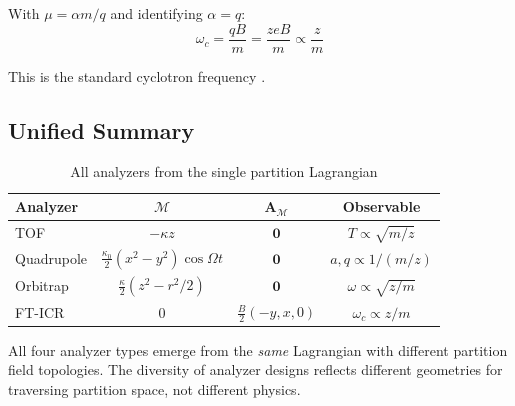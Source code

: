 \documentclass[twocolumn,10pt,a4paper]{article}
\theoremstyle{definition}
\theoremstyle{remark}
\newcommand{\Depth}{\mathcal{M}}
\newcommand{\Apartition}{\mathbf{A}_{\mathcal{M}}}
\newcommand{\partinert}{\mu}
\begin{document}
With $\partinert = \alpha m/q$ and identifying $\alpha = q$:
\begin{equation}
    \boxed{\omega_c = \frac{qB}{m} = \frac{zeB}{m} \propto \frac{z}{m}}
\end{equation}

This is the standard cyclotron frequency \citep{marshall1998}.

\subsection{Unified Summary}

\begin{table}[H]
\centering
\caption{All analyzers from the single partition Lagrangian}
\label{tab:analyzers}
\small
\begin{tabular}{lccc}
\toprule
\textbf{Analyzer} & \textbf{$\Depth$} & \textbf{$\Apartition$} & \textbf{Observable} \\
\midrule
TOF & $-\kappa z$ & $\mathbf{0}$ & $T \propto \sqrt{m/z}$ \\
Quadrupole & $\frac{\kappa_0}{2}(x^2\!-\!y^2)\cos\Omega t$ & $\mathbf{0}$ & $a,q \propto 1/(m/z)$ \\
Orbitrap & $\frac{\kappa}{2}(z^2\!-\!r^2/2)$ & $\mathbf{0}$ & $\omega \propto \sqrt{z/m}$ \\
FT-ICR & $0$ & $\frac{B}{2}(-y,x,0)$ & $\omega_c \propto z/m$ \\
\bottomrule
\end{tabular}
\end{table}

All four analyzer types emerge from the \emph{same} Lagrangian with different partition field topologies. The diversity of analyzer designs reflects different geometries for traversing partition space, not different physics.
\end{document}
